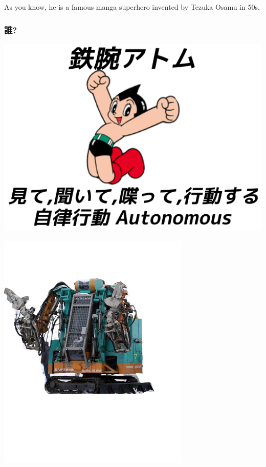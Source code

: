 \begin{resume}
As you know, he is a famous manga superhero invented by Tezuka Osamu in 50s,
\end{resume}

\subsubsection{誰?}
\label{sec-1-1-2}

\begin{container-fluid}
\begin{row-fluid}
\begin{span6}
\includegraphics{img/astro/final.png}
\end{span6}
\begin{span6}
\includegraphics{img/rescue/1.png}
\end{span6}
\end{row-fluid}
\end{container-fluid}


